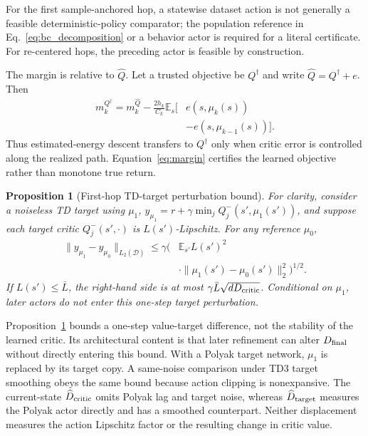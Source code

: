 \documentclass[letterpaper]{article}
\newtheorem{proposition}{Proposition}
\begin{document}
For the first sample-anchored hop, a statewise dataset action is not generally
a feasible deterministic-policy comparator; the population reference in
Eq.~\eqref{eq:bc_decomposition} or a behavior actor is required for a literal
certificate. For re-centered hops, the preceding actor is feasible by
construction.

The margin is relative to $\widehat Q$. Let a trusted objective be
$Q^\dagger$ and write $\widehat Q=Q^\dagger+e$. Then
\begin{equation}
\begin{split}
 m_k^{Q^\dagger}=m_k^{\widehat Q}
 -\frac{2h_k}{C_k}\mathbb E_s[&e(s,\mu_k(s))\\
 &-e(s,\mu_{k-1}(s))].
\end{split}
\label{eq:critic_error_margin}
\end{equation}
Thus estimated-energy descent transfers to $Q^\dagger$ only when critic error
is controlled along the realized path. Equation~\eqref{eq:margin} certifies
the learned objective rather than monotone true return.

\begin{proposition}[First-hop TD-target perturbation bound]
\label{prop:exposure}
For clarity, consider a noiseless TD target using $\mu_1$,
$y_{\mu_1}=r+\gamma\min_jQ_j^-(s',\mu_1(s'))$, and suppose each target critic
$Q_j^-(s',\cdot)$ is $L(s')$-Lipschitz. For any reference $\mu_0$,
\begin{equation}
\begin{split}
\|y_{\mu_1}-y_{\mu_0}\|_{L_2(\mathcal D)}
\leq\gamma\Big(&\mathbb E_{s'}L(s')^2\\
&\cdot\|\mu_1(s')-\mu_0(s')\|_2^2\Big)^{1/2}.
\end{split}
\label{eq:exposure_bound}
\end{equation}
If $L(s')\leq\bar L$, the right-hand side is at most
$\gamma\bar L\sqrt{dD_{\rm critic}}$. Conditional on $\mu_1$, later actors do
not enter this one-step target perturbation.
\end{proposition}

Proposition~\ref{prop:exposure} bounds a one-step value-target difference, not
the stability of the learned critic. Its architectural content is that later
refinement can alter $D_{\rm final}$ without directly entering this bound.
With a Polyak target network, $\mu_1$ is replaced by its target copy. A
same-noise comparison under TD3 target smoothing obeys the same bound because
action clipping is nonexpansive. The current-state
$\widehat D_{\rm critic}$ omits Polyak lag and target noise, whereas
$\widehat D_{\rm target}$ measures the Polyak actor directly and has a
smoothed counterpart. Neither displacement measures the action Lipschitz
factor or the resulting change in critic value.
\end{document}
